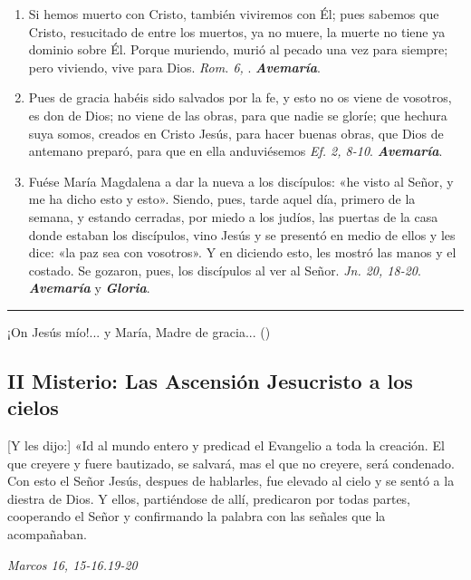 \documentclass[11pt,a4paper]{book}
\begin{document}
\begin{enumerate}
        \item Si hemos muerto con Cristo, también viviremos con Él; pues sabemos que Cristo, resucitado de entre los muertos, ya no muere, la muerte no tiene ya dominio sobre Él. Porque
            muriendo, murió al pecado una vez para siempre; pero viviendo, vive para Dios. \emph{Rom. 6, }. \textbf{\emph{Avemaría}}.
        
        \item Pues de gracia habéis sido salvados por la fe, y esto no os viene de vosotros, es don de Dios; no viene de las obras, para que nadie se gloríe; que hechura suya somos,
            creados en Cristo Jesús, para hacer buenas obras, que Dios de antemano preparó, para que en ella anduviésemos \emph{Ef. 2, 8-10}. \textbf{\emph{Avemaría}}.        

        \item Fuése María Magdalena a dar la nueva a los discípulos: «he visto al Señor, y me ha dicho esto y esto». Siendo, pues, tarde aquel día, primero de la semana, y estando cerradas, 
            por miedo a los judíos, las puertas de la casa donde estaban los discípulos, vino Jesús y se presentó en medio de ellos y les dice: «la paz sea con vosotros». Y en diciendo esto, 
            les mostró las manos y el costado. Se gozaron, pues, los discípulos al ver al Señor. \emph{Jn. 20, 18-20}. \textbf{\emph{Avemaría}} y \textbf{\emph{Gloria}}.
    \end{enumerate}    

    \rule{\textwidth}{0.5pt}
    ¡On Jesús mío!... y María, Madre de gracia... ()

    \subsection*{II Misterio: Las Ascensión Jesucristo a los cielos}

    [Y les dijo:] «Id al mundo entero y predicad el Evangelio a toda la creación. El que creyere y fuere bautizado, 
    se salvará, mas el que no creyere, será condenado. Con esto el Señor Jesús, despues de hablarles, 
    fue elevado al cielo y se sentó a la diestra de Dios. Y ellos, partiéndose de allí, 
    predicaron por todas partes, cooperando el Señor y confirmando la palabra con las señales que la acompañaban. 

    \begin{flushright}
        \emph{Marcos 16, 15-16.19-20}
    \end{flushright}    
\end{document}
